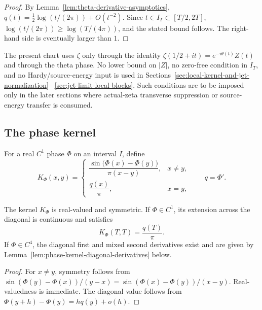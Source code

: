\begin{proof}
By Lemma~\ref{lem:theta-derivative-asymptotics},
\(q(t)=\frac12\log(t/(2\pi))+O(t^{-2})\).  Since \(t\in I_T\subset[T/2,2T]\),
\(\log(t/(2\pi))\ge \log(T/(4\pi))\), and the stated bound follows.  The
right-hand side is eventually larger than \(1\).
\end{proof}

\begin{remark}
\label{rem:chart-regularity-zeta-side}
The present chart uses \(\zeta\) only through the identity
\(\zeta(1/2+it)=e^{-i\theta(t)}Z(t)\) and through the theta phase.  No lower
bound on \(|Z|\), no zero-free condition in \(I_T\), and no Hardy/source-energy
input is used in Sections~\ref{sec:local-kernel-and-jet-normalization}--
\ref{sec:jet-limit-local-blocks}.  Such conditions are to be imposed only in
the later sections where actual-zeta transverse suppression or source-energy
transfer is consumed.
\end{remark}

\subsection{The phase kernel}
\label{subsec:phase-kernel}

\begin{definition}
\label{def:phase-kernel}
For a real \(C^1\) phase \(\Phi\) on an interval \(I\), define
\begin{equation}
\label{eq:phase-kernel}
K_\Phi(x,y)=
\begin{cases}
\dfrac{\sin\bigl(\Phi(x)-\Phi(y)\bigr)}{\pi(x-y)}, & x\ne y,\\[1.2ex]
\dfrac{q(x)}{\pi}, & x=y,
\end{cases}
\qquad q=\Phi'.
\end{equation}
\end{definition}

\begin{lemma}
\label{lem:phase-kernel-properties}
The kernel \(K_\Phi\) is real-valued and symmetric.  If \(\Phi\in C^1\), its
extension across the diagonal is continuous and satisfies
\[
        K_\Phi(T,T)=\frac{q(T)}{\pi}.
\]
If \(\Phi\in C^4\), the diagonal first and mixed second derivatives exist and
are given by Lemma~\ref{lem:phase-kernel-diagonal-derivatives} below.
\end{lemma}

\begin{proof}
For \(x\ne y\), symmetry follows from
\(\sin(\Phi(y)-\Phi(x))/(y-x)=\sin(\Phi(x)-\Phi(y))/(x-y)\).  Real-valuedness
is immediate.  The diagonal value follows from
\(\Phi(y+h)-\Phi(y)=hq(y)+o(h)\).
\end{proof}

